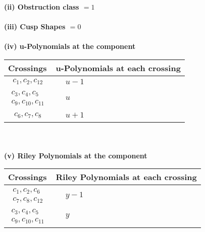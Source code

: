 \documentclass[1p]{elsarticle_modified}
\theoremstyle{definition}
\begin{document}
\flushleft \textbf{(ii) Obstruction class $= 1$}\\~\\
\flushleft \textbf{(iii) Cusp Shapes $= 0$}\\~\\
\newpage\renewcommand{\arraystretch}{1}
\flushleft \textbf{(iv) u-Polynomials at the component}\newline \\
\begin{tabular}{m{50pt}|m{274pt}}
Crossings & \hspace{64pt}u-Polynomials at each crossing \\
\hline $$\begin{aligned}c_{1},c_{2},c_{12}\end{aligned}$$&$\begin{aligned}
&u-1
\end{aligned}$\\
\hline $$\begin{aligned}c_{3},c_{4},c_{5}\\c_{9},c_{10},c_{11}\end{aligned}$$&$\begin{aligned}
&u
\end{aligned}$\\
\hline $$\begin{aligned}c_{6},c_{7},c_{8}\end{aligned}$$&$\begin{aligned}
&u+1
\end{aligned}$\\
\hline
\end{tabular}\\~\\
\newpage\renewcommand{\arraystretch}{1}
\flushleft \textbf{(v) Riley Polynomials at the component}\newline \\
\begin{tabular}{m{50pt}|m{274pt}}
Crossings & \hspace{64pt}Riley Polynomials at each crossing \\
\hline $$\begin{aligned}c_{1},c_{2},c_{6}\\c_{7},c_{8},c_{12}\end{aligned}$$&$\begin{aligned}
&y-1
\end{aligned}$\\
\hline $$\begin{aligned}c_{3},c_{4},c_{5}\\c_{9},c_{10},c_{11}\end{aligned}$$&$\begin{aligned}
&y
\end{aligned}$\\
\hline
\end{tabular}\\~\\
\end{document}
